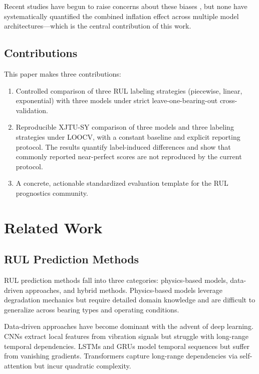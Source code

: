 \documentclass[5p,twocolumn]{elsarticle}
\begin{document}
Recent studies have begun to raise concerns about these biases \cite{zhao2021deep, caesarendra2021machine}, but none have systematically quantified the combined inflation effect across multiple model architectures---which is the central contribution of this work.

\subsection{Contributions}

This paper makes three contributions:

\begin{enumerate}
    \item Controlled comparison of three RUL labeling strategies (piecewise, linear, exponential) with three models under strict leave-one-bearing-out cross-validation.
    \item Reproducible XJTU-SY comparison of three models and three labeling strategies under LOOCV, with a constant baseline and explicit reporting protocol. The results quantify label-induced differences and show that commonly reported near-perfect scores are not reproduced by the current protocol.
    \item A concrete, actionable standardized evaluation template for the RUL prognostics community.
\end{enumerate}


\section{Related Work}
\label{sec:related}

\subsection{RUL Prediction Methods}

RUL prediction methods fall into three categories: physics-based models, data-driven approaches, and hybrid methods. Physics-based models \cite{paris1963critical, kotzalas2004fatigue} leverage degradation mechanics but require detailed domain knowledge and are difficult to generalize across bearing types and operating conditions.

Data-driven approaches have become dominant with the advent of deep learning. CNNs \cite{li2020multiscale, ince2016real} extract local features from vibration signals but struggle with long-range temporal dependencies. LSTMs and GRUs \cite{zhang2020lstm, chen2021gru} model temporal sequences but suffer from vanishing gradients. Transformers \cite{mo2022transformer, vaswani2017attention} capture long-range dependencies via self-attention but incur quadratic complexity.
\end{document}

